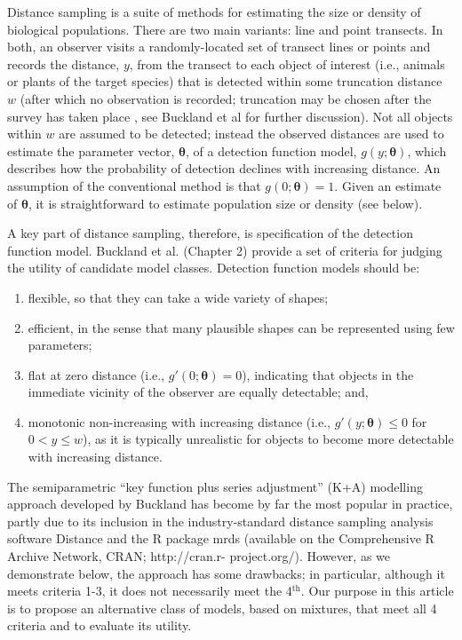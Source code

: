 \documentclass[10pt]{article}
\begin{document}
Distance sampling \cite{Buckland:2001vm,Buckland:2004ts} is a suite of methods for estimating the size or density of biological populations.  There are two main variants: line and point transects. In both, an observer visits a randomly-located set of transect lines or points and records the distance, $y$, from the transect to each object of interest (i.e., animals or plants of the target species) that is detected within some truncation distance $w$ (after which no observation is recorded; truncation may be chosen after the survey has taken place , see Buckland et al \cite{Buckland:2001vm} for further discussion).  Not all objects within $w$ are assumed to be detected; instead the observed distances are used to estimate the parameter vector, $\boldsymbol{\theta}$, of a detection function model, $g(y;\boldsymbol{\theta})$, which describes how the probability of detection declines with increasing distance.  An assumption of the conventional method is that $g(0;\boldsymbol{\theta})=1$. Given an estimate of $\boldsymbol{\theta}$, it is straightforward to estimate population size or density (see below).

A key part of distance sampling, therefore, is specification of the detection function model. Buckland et al. (Chapter 2) \cite{Buckland:2001vm} provide a set of criteria for judging the utility of candidate model classes. Detection function models should be:
\begin{enumerate}
\item flexible, so that they can take a wide variety of shapes;
\item efficient, in the sense that many plausible shapes can be represented using few parameters;
\item flat at zero distance (i.e., $g'(0;\boldsymbol{\theta})=0$), indicating that objects in the immediate vicinity of the observer are equally detectable; and,
\item monotonic non-increasing with increasing distance (i.e., $g'(y;\boldsymbol{\theta}) \leq 0$ for $0<y\leq w$), as it is typically unrealistic for objects to become more detectable with increasing distance.
\end{enumerate}
The semiparametric ``key function plus series adjustment'' (K+A) modelling approach developed by Buckland \cite{Buckland:1992wy} has become by far the most popular in practice, partly due to its inclusion in the industry-standard distance sampling analysis software Distance \cite{Thomas:2010cf} and the R \cite{Team:2013wf} package mrds \cite{mrds} (available on the Comprehensive R Archive Network, CRAN; http://cran.r- project.org/).  However, as we demonstrate below, the approach has some drawbacks; in particular, although it meets criteria 1-3, it does not necessarily meet the 4$^\text{th}$.  Our purpose in this article is to propose an alternative class of models, based on mixtures, that meet all 4 criteria and to evaluate its utility.  
\end{document}
